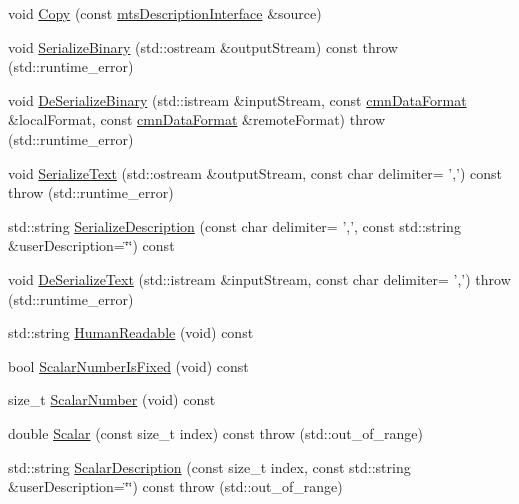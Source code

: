 \begin{DoxyCompactItemize}
void \hyperlink{classmts_description_interface_aa7af3614c532d37c59e3a4f3e0efec00}{Copy} (const \hyperlink{classmts_description_interface}{mts\-Description\-Interface} \&source)
\item 
void \hyperlink{classmts_description_interface_adc40d04bbdee8837562007b6d9427664}{Serialize\-Binary} (std\-::ostream \&output\-Stream) const   throw (std\-::runtime\-\_\-error)
\item 
void \hyperlink{classmts_description_interface_a7b0b3af98f4406df87e9a9b44e0e11ea}{De\-Serialize\-Binary} (std\-::istream \&input\-Stream, const \hyperlink{classcmn_data_format}{cmn\-Data\-Format} \&local\-Format, const \hyperlink{classcmn_data_format}{cmn\-Data\-Format} \&remote\-Format)  throw (std\-::runtime\-\_\-error)
\item 
void \hyperlink{classmts_description_interface_a540707553661dfd862c9433f3c57f6b2}{Serialize\-Text} (std\-::ostream \&output\-Stream, const char delimiter= ',') const   throw (std\-::runtime\-\_\-error)
\item 
std\-::string \hyperlink{classmts_description_interface_a3f679702acc7acbcd8c8aa7072ee6640}{Serialize\-Description} (const char delimiter= ',', const std\-::string \&user\-Description=\char`\"{}\char`\"{}) const 
\item 
void \hyperlink{classmts_description_interface_a6a0e72813a01d7f162ebdd80fd102cb9}{De\-Serialize\-Text} (std\-::istream \&input\-Stream, const char delimiter= ',')  throw (std\-::runtime\-\_\-error)
\item 
std\-::string \hyperlink{classmts_description_interface_a5e38034e0db5510ce2dae71d192a1ded}{Human\-Readable} (void) const 
\item 
bool \hyperlink{classmts_description_interface_a7d8f050a390b5636ebd931483ef564ea}{Scalar\-Number\-Is\-Fixed} (void) const 
\item 
size\-\_\-t \hyperlink{classmts_description_interface_a1b31753c7ef6ac45d9205ff8474acc3e}{Scalar\-Number} (void) const 
\item 
double \hyperlink{classmts_description_interface_a123c72143f8b1e39b4046549dc50f252}{Scalar} (const size\-\_\-t index) const   throw (std\-::out\-\_\-of\-\_\-range)
\item 
std\-::string \hyperlink{classmts_description_interface_a5e433f8e5447700e860f15756868bef0}{Scalar\-Description} (const size\-\_\-t index, const std\-::string \&user\-Description=\char`\"{}\char`\"{}) const   throw (std\-::out\-\_\-of\-\_\-range)
\end{DoxyCompactItemize}
